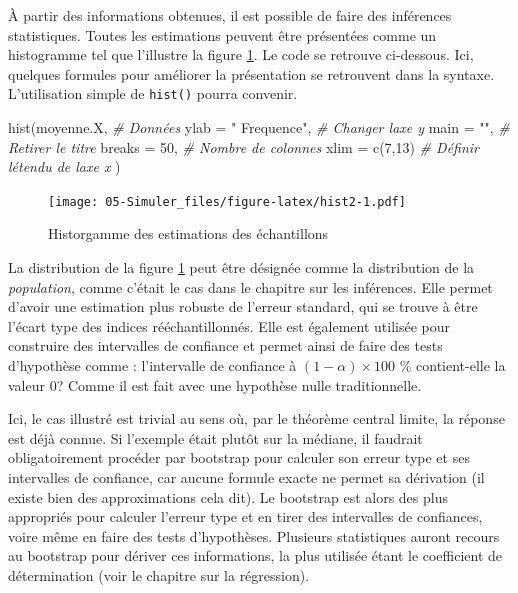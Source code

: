 \documentclass[
]{book}
\newenvironment{Shaded}{}{}
\newcommand{\AttributeTok}[1]{#1}
\newcommand{\CommentTok}[1]{\textit{#1}}
\newcommand{\DecValTok}[1]{#1}
\newcommand{\FunctionTok}[1]{#1}
\newcommand{\NormalTok}[1]{#1}
\newcommand{\StringTok}[1]{#1}
\begin{document}
À partir des informations obtenues, il est possible de faire des inférences statistiques. Toutes les estimations peuvent être présentées comme un histogramme tel que l'illustre la figure \ref{fig:hist2}. Le code se retrouve ci-dessous. Ici, quelques formules pour améliorer la présentation se retrouvent dans la syntaxe. L'utilisation simple de \texttt{hist()} pourra convenir.

\begin{Shaded}
\begin{Highlighting}[]
\FunctionTok{hist}\NormalTok{(moyenne.X,              }\CommentTok{\# Données}
     \AttributeTok{ylab =} \StringTok{" Frequence"}\NormalTok{,    }\CommentTok{\# Changer l\textquotesingle{}axe y}
     \AttributeTok{main =} \StringTok{""}\NormalTok{,              }\CommentTok{\# Retirer le titre}
     \AttributeTok{breaks =} \DecValTok{50}\NormalTok{,            }\CommentTok{\# Nombre de colonnes}
     \AttributeTok{xlim =} \FunctionTok{c}\NormalTok{(}\DecValTok{7}\NormalTok{,}\DecValTok{13}\NormalTok{)          }\CommentTok{\# Définir l\textquotesingle{}étendu de l\textquotesingle{}axe x}
\NormalTok{)}
\end{Highlighting}
\end{Shaded}

\begin{figure}
\centering
\texttt{[image: 05-Simuler\_files/figure-latex/hist2-1.pdf]}
\caption{\label{fig:hist2}Historgamme des estimations des échantillons}
\end{figure}

La distribution de la figure \ref{fig:hist2} peut être désignée comme la distribution de la \emph{population}, comme c'était le cas dans le chapitre sur les inférences. Elle permet d'avoir une estimation plus robuste de l'erreur standard, qui se trouve à être l'écart type des indices rééchantillonnés. Elle est également utilisée pour construire des intervalles de confiance et permet ainsi de faire des tests d'hypothèse comme : l'intervalle de confiance à \((1-\alpha) \times 100\) \% contient-elle la valeur 0? Comme il est fait avec une hypothèse nulle traditionnelle.

Ici, le cas illustré est trivial au sens où, par le théorème central limite, la réponse est déjà connue. Si l'exemple était plutôt sur la médiane, il faudrait obligatoirement procéder par bootstrap pour calculer son erreur type et ses intervalles de confiance, car aucune formule exacte ne permet sa dérivation (il existe bien des approximations cela dit). Le bootstrap est alors des plus appropriés pour calculer l'erreur type et en tirer des intervalles de confiances, voire même en faire des tests d'hypothèses. Plusieurs statistiques auront recours au bootstrap pour dériver ces informations, la plus utilisée étant le coefficient de détermination (voir le chapitre sur la régression).
\end{document}
